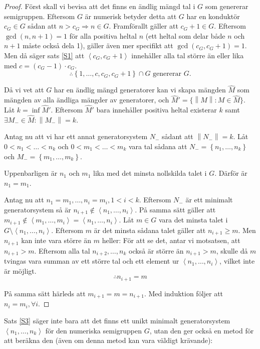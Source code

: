 \begin{proof}
Först skall vi bevisa att det finns en ändlig mängd tal i $G$ som genererar semigruppen. Eftersom $G$ är numerisk betyder detta att $G$ har en konduktör $c_G \in G$ sådan att $n > c_G \Longrightarrow n \in G$. Framförallt gäller att $c_G+1\in G$. Eftersom $\gcd(n,n+1)=1$ för alla positiva heltal $n$ (ett heltal som delar både $n$ och $n+1$ måste också dela 1), gäller även mer specifikt att $\gcd(c_G,c_G+1)=1$. Men då säger sats \ref{S1} att $\left<c_G, c_G+1\right>$ innehåller alla tal större än eller lika med $c = (c_G - 1)\cdot c_G$.
\[\therefore \left\{1, \ldots, c, c_G, c_G+1\right\} \cap G \text{ genererar } G\text{.}\]

Då vi vet att $G$ har en ändlig mängd generatorer kan vi skapa mängden $\widehat{M}$ som mängden av alla ändliga mängder av generatorer, och $\widehat{M}' = \{ \left\|M\right\| : M \in \widehat{M}\}$. Låt $k = \inf \widehat{M}'$. Eftersom $\widehat{M}'$ bara innehåller positiva heltal existerar $k$ samt $\exists M_- \in \widehat{M} : \left\|M_-\right\|=k$.

Antag nu att vi har ett annat generatorsystem $N_-$ sådant att $\left\|N_-\right\| = k$. Låt $0 < n_1 < \ldots< n_k$ och $0 < m_1 < \ldots< m_k$ vara tal sådana att $N_-= \left\{n_1, \ldots, n_k\right\}$ och $M_- = \left\{m_1, \ldots, m_k\right\}$.

Uppenbarligen är $n_1$ och $m_1$ lika med det minsta nollskilda talet i $G$. Därför är $n_1 = m_1$.

Antag nu att $n_1 = m_1, \ldots, n_i = m_i, 1 < i < k$. Eftersom $N_-$ är ett minimalt generatorsystem så är $n_{i+1} \notin \left<n_1, \ldots, n_i\right>$. På samma sätt gäller att $m_{i+1} \notin \left<m_1, \ldots, m_i\right> = \left<n_1, \ldots, n_i\right>$. Låt $m \in G$ vara det minsta talet i $G \setminus \left<n_1, \ldots, n_i\right>$. Eftersom $m$ är det minsta sådana talet gäller att $n_{i+1} \geq m$. Men $n_{i+1}$ kan inte vara större än $m$ heller: För att se det, antar vi motsatsen, att $n_{i+1}>m$. Eftersom alla tal $n_{i+2}, \ldots, n_k$ också är större än $n_{i+1} > m$, skulle då $m$ tvingas vara summan av ett större tal och ett element ur $\left<n_1, \ldots, n_i\right>$, vilket inte är möjligt.
\[\therefore n_{i+1} = m\]

På samma sätt härleds att $m_{i+1} = m = n_{i+1}$. Med induktion följer att $n_i = m_i, \forall i$.
\end{proof}

Sats \ref{S3} säger inte bara att det finns ett unikt minimalt generatorsystem $\left<n_1, \ldots, n_k\right>$ för den numeriska semigruppen $G$, utan den ger också en metod för att beräkna den (även om denna metod kan vara väldigt krävande):

